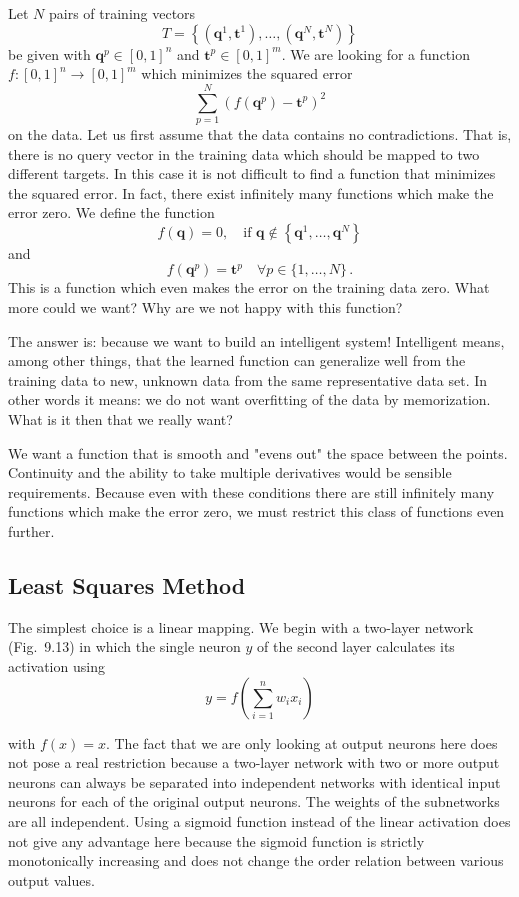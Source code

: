 \documentclass[10pt]{book}
\begin{document}
Let $N$ pairs of training vectors
$$
T=\left\{\left(\boldsymbol{q}^{1}, \boldsymbol{t}^{1}\right), \ldots,\left(\boldsymbol{q}^{N}, \boldsymbol{t}^{N}\right)\right\}
$$
be given with $\boldsymbol{q}^{p} \in [0,1]^{n}$ and $\boldsymbol{t}^{p} \in [0,1]^{m}$. We are looking for a function $f:[0,1]^{n} \rightarrow [0,1]^{m}$ which minimizes the squared error
$$
\sum_{p=1}^{N}\left(f\left(\boldsymbol{q}^{p}\right)-\boldsymbol{t}^{p}\right)^{2}
$$
on the data. Let us first assume that the data contains no contradictions. That is, there is no query vector in the training data which should be mapped to two different targets. In this case it is not difficult to find a function that minimizes the squared error. In fact, there exist infinitely many functions which make the error zero. We define the function
$$
f(\boldsymbol{q})=0, \quad \text{if } \boldsymbol{q} \notin\left\{\boldsymbol{q}^{1}, \ldots, \boldsymbol{q}^{N}\right\}
$$
and
$$
f\left(\boldsymbol{q}^{p}\right)=\boldsymbol{t}^{p} \quad \forall p \in\{1, \ldots, N\}\, .
$$
This is a function which even makes the error on the training data zero. What more could we want? Why are we not happy with this function?

The answer is: because we want to build an intelligent system! Intelligent means, among other things, that the learned function can generalize well from the training data to new, unknown data from the same representative data set. In other words it means: we do not want overfitting of the data by memorization. What is it then that we really want?

We want a function that is smooth and "evens out" the space between the points. Continuity and the ability to take multiple derivatives would be sensible requirements. Because even with these conditions there are still infinitely many functions which make the error zero, we must restrict this class of functions even further.

\subsection{Least Squares Method}
The simplest choice is a linear mapping. We begin with a two-layer network (Fig.~9.13) in which the single neuron $y$ of the second layer calculates its activation using
$$
y=f\left(\sum_{i=1}^{n} w_{i} x_{i}\right)
$$

with $f(x)=x$. The fact that we are only looking at output neurons here does not pose a real restriction because a two-layer network with two or more output neurons can always be separated into independent networks with identical input neurons for each of the original output neurons. The weights of the subnetworks are all independent. Using a sigmoid function instead of the linear activation does not give any advantage here because the sigmoid function is strictly monotonically increasing and does not change the order relation between various output values.
\end{document}

